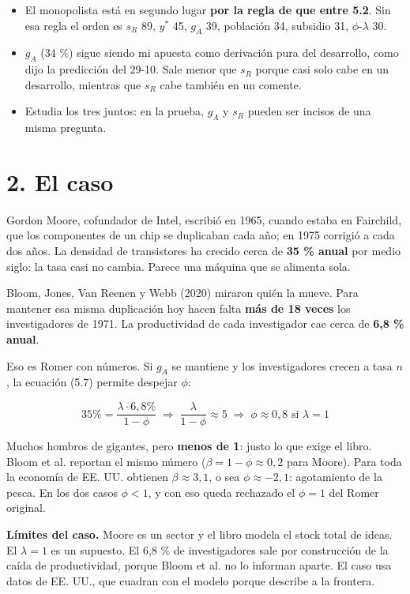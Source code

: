 \documentclass[11pt,a4paper]{article}
\begin{document}
\begin{itemize}[leftmargin=*,itemsep=2pt,topsep=2pt]
\item El monopolista está en segundo lugar \textbf{por la regla de que entre 5.2}. Sin esa regla el orden es $s_R$ 89, $y^*$ 45, $g_A$ 39, población 34, subsidio 31, $\phi$-$\lambda$ 30.
\item $g_A$ (34 \%) sigue siendo mi apuesta como derivación pura del desarrollo, como dijo la predicción del 29-10. Sale menor que $s_R$ porque casi solo cabe en un desarrollo, mientras que $s_R$ cabe también en un comente.
\item Estudia los tres juntos: en la prueba, $g_A$ y $s_R$ pueden ser incisos de una misma pregunta.
\end{itemize}

\section*{2. El caso}

Gordon Moore, cofundador de Intel, escribió en 1965, cuando estaba en Fairchild, que los componentes de un chip se duplicaban cada año; en 1975 corrigió a cada dos años. La densidad de transistores ha crecido cerca de \textbf{35 \% anual} por medio siglo: la tasa casi no cambia. Parece una máquina que se alimenta sola.

Bloom, Jones, Van Reenen y Webb (2020) miraron quién la mueve. Para mantener esa misma duplicación hoy hacen falta \textbf{más de 18 veces} los investigadores de 1971. La productividad de cada investigador cae cerca de \textbf{6,8 \% anual}.

Eso es Romer con números. Si $g_A$ se mantiene y los investigadores crecen a tasa $n$, la ecuación (5.7) permite despejar $\phi$:

\begin{equation*}35\% = \frac{\lambda \cdot 6{,}8\%}{1-\phi} \;\Rightarrow\; \frac{\lambda}{1-\phi} \approx 5 \;\Rightarrow\; \phi \approx 0{,}8 \text{ si } \lambda = 1\end{equation*}

Muchos hombros de gigantes, pero \textbf{menos de 1}: justo lo que exige el libro. Bloom et al. reportan el mismo número ($\beta = 1-\phi \approx 0{,}2$ para Moore). Para toda la economía de EE. UU. obtienen $\beta \approx 3{,}1$, o sea $\phi \approx -2{,}1$: agotamiento de la pesca. En los dos casos $\phi < 1$, y con eso queda rechazado el $\phi = 1$ del Romer original.

\textbf{Límites del caso.} Moore es un sector y el libro modela el stock total de ideas. El $\lambda = 1$ es un supuesto. El 6,8 \% de investigadores sale por construcción de la caída de productividad, porque Bloom et al. no lo informan aparte. El caso usa datos de EE. UU., que cuadran con el modelo porque describe a la frontera.
\end{document}
